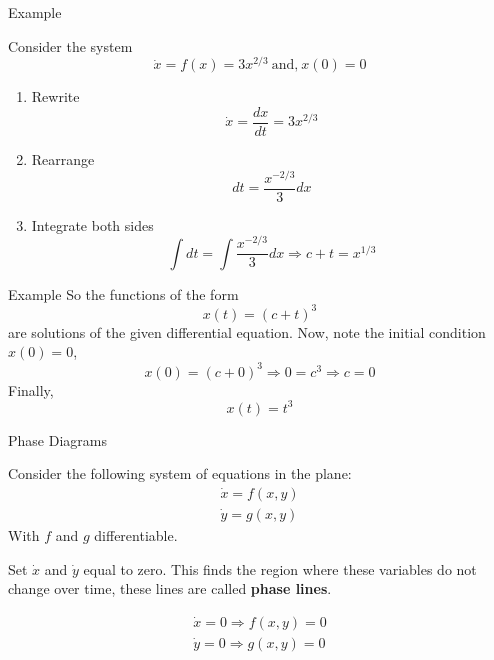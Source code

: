 \documentclass[aspectratio=169]{beamer}
\begin{document}
\begin{frame}{Example}

Consider the system \[\dot{x}=f(x)=3x^{2/3}\ \text{and,}\ x(0)=0\]

\begin{enumerate}
    \item<2-> Rewrite \[\dot{x}=\frac{dx}{dt}=3x^{2/3}\]
    \item<3-> Rearrange \[dt=\frac{x^{-2/3}}{3}dx\]
    \item<4-> Integrate both sides \[\int dt = \int \frac{x^{-2/3}}{3}dx\Rightarrow c+t=x^{1/3}\]
\end{enumerate}
    
\end{frame}

\begin{frame}{Example}
    So the functions of the form \[x(t)=(c+t)^3\] are solutions of the given differential equation. Now, note the initial condition $x(0)=0$,
    \[x(0)=(c+0)^3\Rightarrow 0=c^3\Rightarrow c=0\]
    Finally, \[x(t)=t^3\]
\end{frame}

\begin{frame}{Phase Diagrams}

    Consider the following system of equations in the plane:
    \begin{align*}
        \dot{x}=f(x,y)\\
        \dot{y}=g(x,y)
    \end{align*}
    With $f$ and $g$ differentiable.
    
    Set $\dot{x}$ and $\dot{y}$ equal to zero. This finds the region where these variables do not change over time, these lines are called \textbf{phase lines}.
    
    \begin{align*}
        \dot{x}=0\Rightarrow f(x,y)=0\\
        \dot{y}=0\Rightarrow g(x,y)=0
    \end{align*}
    
\end{frame}
\end{document}
